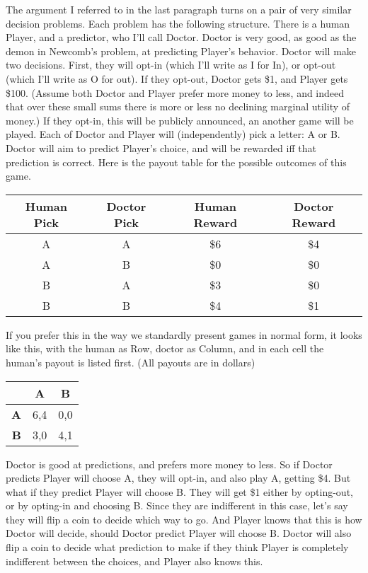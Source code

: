 \documentclass[
  12pt,
]{article}
\begin{document}
The argument I referred to in the last paragraph turns on a pair of very
similar decision problems. Each problem has the following structure.
There is a human Player, and a predictor, who I'll call Doctor. Doctor
is very good, as good as the demon in Newcomb's problem, at predicting
Player's behavior. Doctor will make two decisions. First, they will
opt-in (which I'll write as I for In), or opt-out (which I'll write as O
for out). If they opt-out, Doctor gets \$1, and Player gets \$100.
(Assume both Doctor and Player prefer more money to less, and indeed
that over these small sums there is more or less no declining marginal
utility of money.) If they opt-in, this will be publicly announced, an
another game will be played. Each of Doctor and Player will
(independently) pick a letter: A or B. Doctor will aim to predict
Player's choice, and will be rewarded iff that prediction is correct.
Here is the payout table for the possible outcomes of this game.

\begin{longtable}[]{@{}cccc@{}}
\toprule
Human Pick & Doctor Pick & Human Reward & Doctor Reward \\
\midrule
\endhead
A & A & \$6 & \$4 \\
A & B & \$0 & \$0 \\
B & A & \$3 & \$0 \\
B & B & \$4 & \$1 \\
\bottomrule
\end{longtable}

If you prefer this in the way we standardly present games in normal
form, it looks like this, with the human as Row, doctor as Column, and
in each cell the human's payout is listed first. (All payouts are in
dollars)

\begin{table}[H]
\centering
\begin{tabular}[t]{>{}r|cc}

\textbf{ } & \textbf{A} & \textbf{B}\\
\midrule
\textbf{A} & 6,4 & 0,0\\
\textbf{B} & 3,0 & 4,1\\

\end{tabular}
\end{table}

Doctor is good at predictions, and prefers more money to less. So if
Doctor predicts Player will choose A, they will opt-in, and also play A,
getting \$4. But what if they predict Player will choose B. They will
get \$1 either by opting-out, or by opting-in and choosing B. Since they
are indifferent in this case, let's say they will flip a coin to decide
which way to go. And Player knows that this is how Doctor will decide,
should Doctor predict Player will choose B. Doctor will also flip a coin
to decide what prediction to make if they think Player is completely
indifferent between the choices, and Player also knows this.
\end{document}
